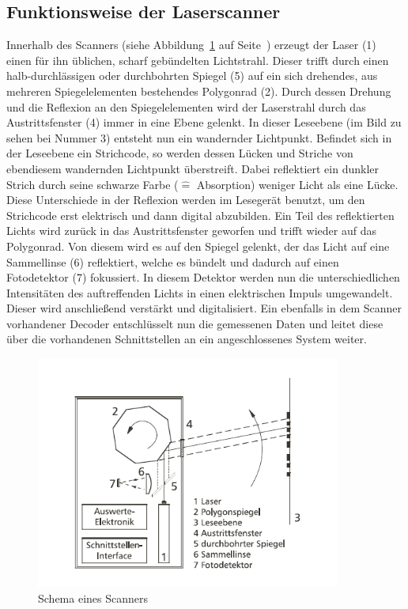 \subsection{Funktionsweise der Laserscanner}
Innerhalb des Scanners (siehe Abbildung~\ref{fig:scannerschema} auf Seite~\pageref{fig:scannerschema}) erzeugt der Laser (1) einen für ihn üblichen, scharf gebündelten Lichtstrahl. Dieser trifft durch einen halb-durchlässigen oder durchbohrten Spiegel (5) auf ein sich drehendes, aus mehreren Spiegelelementen bestehendes Polygonrad (2). Durch dessen Drehung und die Reflexion an den Spiegelelementen wird der Laserstrahl durch das Austrittsfenster (4) immer in eine Ebene gelenkt.
In dieser Leseebene (im Bild zu sehen bei Nummer 3) entsteht nun ein wandernder Lichtpunkt. 
Befindet sich in der Leseebene ein Strichcode, so werden dessen Lücken und Striche von ebendiesem wandernden Lichtpunkt überstreift. Dabei reflektiert ein dunkler Strich durch seine schwarze Farbe ($\widehat{=}$ Absorption) weniger Licht als eine Lücke. Diese Unterschiede in der Reflexion werden im Lesegerät benutzt, um den Strichcode erst elektrisch und dann digital abzubilden. Ein Teil des reflektierten Lichts wird zurück in das Austrittsfenster geworfen und trifft wieder auf das Polygonrad. 
Von diesem wird es auf den Spiegel gelenkt, der das Licht auf eine Sammellinse (6) reflektiert, welche es bündelt und dadurch auf einen Fotodetektor (7) fokussiert.\pagebreak
In diesem Detektor werden nun die unterschiedlichen Intensitäten des auftreffenden Lichts in einen elektrischen Impuls umgewandelt. Dieser wird anschließend verstärkt und digitalisiert. Ein ebenfalls in dem Scanner vorhandener Decoder entschlüsselt nun die gemessenen Daten und leitet diese über die vorhandenen Schnittstellen an ein angeschlossenes System weiter. 
\begin{figure}[htbp]
	\centering
		\includegraphics[width=10cm]{Bilder/Schema_Scanner.png}
		\caption[Schema eines Scanners]{Schema eines Scanners\footnotemark}
		\label{fig:scannerschema}
	\hfill
\end{figure}

\pagebreak
